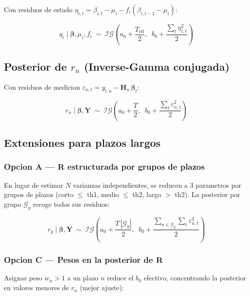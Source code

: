 \documentclass[12pt, a4paper]{article}
\theoremstyle{plain}
\theoremstyle{definition}
\theoremstyle{remark}
\newcommand{\bbet}{\bm{\beta}}
\newcommand{\bY}{\mathbf{Y}}
\newcommand{\bH}{\mathbf{H}}
\newcommand{\bR}{\mathbf{R}}
\newcommand{\IG}{\mathcal{IG}}
\begin{document}
Con residuos de estado $\eta_{i,t} = \beta_{i,t} - \mu_i - f_i(\beta_{i,t-1}-\mu_i)$:

\begin{equation}
  q_i \mid \bbet, \mu_i, f_i \;\sim\;
  \IG\!\left(a_0 + \frac{T_\text{eff}}{2},\;\;
    b_0 + \frac{\sum_t \eta_{i,t}^2}{2}\right)
  \label{eq:post_q}
\end{equation}

\subsection{Posterior de $r_n$ (Inverse-Gamma conjugada)}

Con residuos de medicion $\varepsilon_{n,t} = y_{t,n} - \bH_n\,\bbet_t$:

\begin{equation}
  r_n \mid \bbet, \bY \;\sim\;
  \IG\!\left(a_0 + \frac{T}{2},\;\;
    b_0 + \frac{\sum_t \varepsilon_{n,t}^2}{2}\right)
  \label{eq:post_r}
\end{equation}

\subsection{Extensiones para plazos largos}

\subsubsection{Opcion A --- $\bR$ estructurada por grupos de plazos}

En lugar de estimar $N$ varianzas independientes, se reducen a 3 parametros
por grupos de plazos (corto $\leq$ th1, medio $\leq$ th2, largo $>$ th2).
La posterior por grupo $\mathcal{G}_g$ recoge todos sus residuos:

\begin{equation}
  r_g \mid \bbet, \bY \;\sim\;
  \IG\!\left(a_0 + \frac{T\,|\mathcal{G}_g|}{2},\;\;
    b_0 + \frac{\sum_{n \in \mathcal{G}_g}\sum_t \varepsilon_{n,t}^2}{2}\right)
  \label{eq:post_r_grupos}
\end{equation}

\subsubsection{Opcion C --- Pesos en la posterior de $\bR$}

Asignar peso $w_n > 1$ a un plazo $n$ reduce el $b_0$ efectivo,
concentrando la posterior en valores menores de $r_n$ (mejor ajuste):
\end{document}
